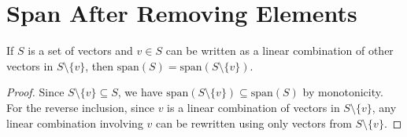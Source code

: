 \section{Span After Removing Elements}

\begin{theorem}
  \label{theorem : span_remove_element}
  \leanok
  If $S$ is a set of vectors and $v \in S$ can be written as a linear combination of other vectors in $S \setminus \{v\}$, then $\text{span}(S) = \text{span}(S \setminus \{v\})$.
\end{theorem}

\begin{proof}
  Since $S \setminus \{v\} \subseteq S$, we have $\text{span}(S \setminus \{v\}) \subseteq \text{span}(S)$ by monotonicity. For the reverse inclusion, since $v$ is a linear combination of vectors in $S \setminus \{v\}$, any linear combination involving $v$ can be rewritten using only vectors from $S \setminus \{v\}$.
\end{proof}